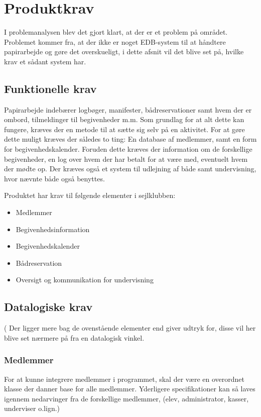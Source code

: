 \chapter{Produktkrav}
I problemanalysen blev det gjort klart, at der er et problem på området. Problemet kommer fra, at der ikke er noget EDB-system til at håndtere papirarbejde og gøre det overskueligt, i dette afsnit vil det blive set på, hvilke krav et sådant
system har.

\section{Funktionelle krav} \label{sec:funktionelleKrav}
Papirarbejde indebærer logbøger, manifester, bådreservationer samt hvem der er ombord, tilmeldinger til begivenheder m.m.
Som grundlag for at alt dette kan fungere, kræves der en metode til at sætte sig selv på en aktivitet. For at gøre dette
muligt kræves der således to ting: En database af medlemmer, samt en form for begivenhedskalender. Foruden dette kræves
der information om de forskellige begivenheder, en log over hvem der har betalt for at være med, eventuelt hvem der
mødte op. Der kræves også et system til udlejning af både samt undervisning, hvor nævnte både også benyttes.

Produktet har krav til følgende elementer i sejlklubben:
\begin{itemize}
  \item Medlemmer
  \item Begivenhedsinformation
  \item Begivenhedskalender
  \item Bådreservation
  \item Oversigt og kommunikation for undervisning
\end{itemize}

\section{Datalogiske krav}(
Der ligger mere bag de ovenstående elementer end  giver udtryk for, disse vil her blive set nærmere på fra en datalogisk vinkel.
\subsection{Medlemmer}
For at kunne integrere medlemmer i programmet, skal der være en overordnet klasse der danner base for alle medlemmer. Yderligere specifikationer kan så laves igennem nedarvinger fra de forskellige medlemmer, (elev, administrator, kasser, underviser o.lign.)
